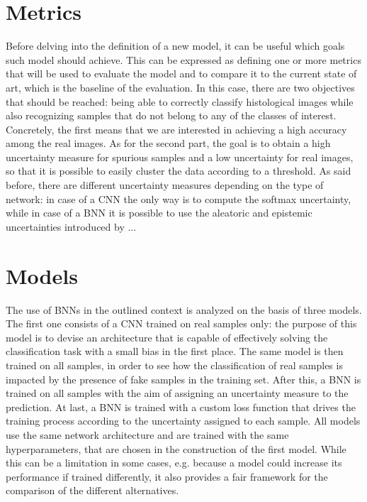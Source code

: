 \documentclass[11pt,twoside,a4paper]{article}
\begin{document}
\section{Metrics}
\label{sec:metrics}
Before delving into the definition of a new model, it can be useful which goals such model should achieve. This can be expressed as defining one or more metrics that will be used to evaluate the model and to compare it to the current state of art, which is the baseline of the evaluation.\newline
In this case, there are two objectives that should be reached: being able to correctly classify histological images while also recognizing samples that do not belong to any of the classes of interest. Concretely, the first means that we are interested in achieving a high accuracy among the real images. As for the second part, the goal is to obtain a high uncertainty measure for spurious samples and a low uncertainty for real images, so that it is possible to easily cluster the data according to a threshold.\newline
As said before, there are different uncertainty measures depending on the type of network: in case of a CNN the only way is to compute the softmax uncertainty, while in case of a BNN it is possible to use the aleatoric and epistemic uncertainties introduced by ...

\section{Models}
\label{sec:models}
The use of BNNs in the outlined context is analyzed on the basis of three models. The first one consists of a CNN trained on real samples only: the purpose of this model is to devise an architecture that is capable of effectively solving the classification task with a small bias in the first place. The same model is then trained on all samples, in order to see how the classification of real samples is impacted by the presence of fake samples in the training set. After this, a BNN is trained on all samples with the aim of assigning an uncertainty measure to the prediction. At last, a BNN is trained with a custom loss function that drives the training process according to the uncertainty assigned to each sample.\newline
All models use the same network architecture and are trained with the same hyperparameters, that are chosen in the construction of the first model. While this can be a limitation in some cases, e.g. because a model could increase its performance if trained differently, it also provides a fair framework for the comparison of the different alternatives.
\end{document}
